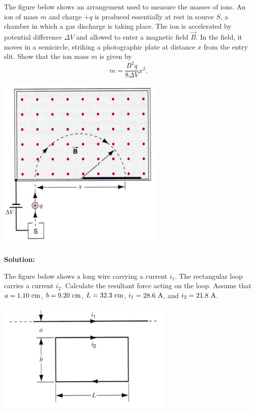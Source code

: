 \documentclass[11pt]{article}
\begin{document}
\vspace*{0.25in}


\begin{problem}[(P32.6)]
The figure below shows an arrangement used to measure the masses of ions. An ion of mass $m$ and charge $+q$ is produced essentially at rest in
source $S$, a chamber in which a gas discharge is taking place. The ion is accelerated by potential difference $\Delta V$ and allowed to enter a magnetic field
$\vec{B}$. In the field, it moves in a semicircle, striking a photographic plate at distance $x$ from the entry slit. Show that the ion mass $m$ is given by 
\[
	m=\frac{B^2q}{8\Delta V}x^2.
\]
\begin{center}
\includegraphics[scale=0.4]{prob1.png}
\end{center}
\end{problem}


\textbf{Solution:}\\

\clearpage

\begin{problem}[(E33.24)*]
The figure below shows a long wire carrying a current $i_1$. The rectangular loop carries a current $i_2$. Calculate the resultant force acting on the loop. Assume that $a=1.10~\mathrm{cm}$, $b=9.20~\mathrm{cm}$, $L=32.3~\mathrm{cm}$, $i_1=28.6~\mathrm{A}$, and $i_2=21.8~\mathrm{A}$.	
\begin{center}
\includegraphics[scale=0.5]{prob2.png}
\end{center}
\end{problem}
\end{document}
